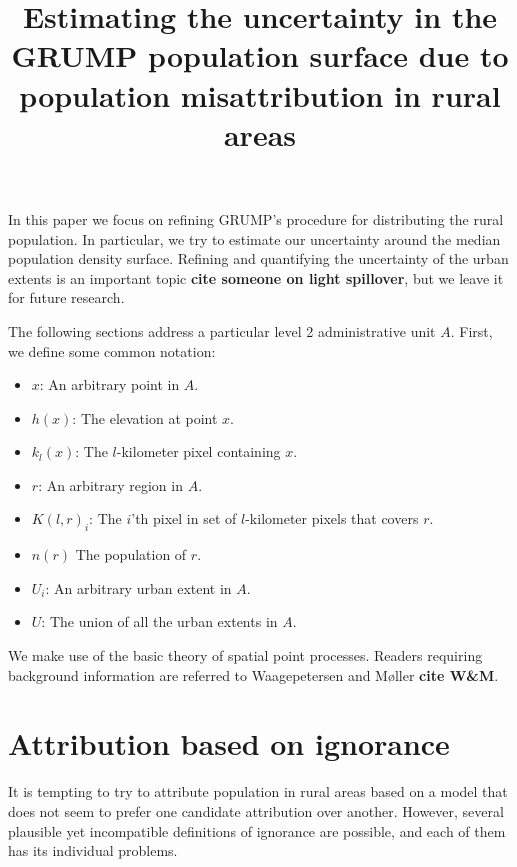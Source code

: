 \documentclass[a4paper]{article}
\begin{document}
\title{Estimating the uncertainty in the GRUMP population surface due to population misattribution in rural areas}
\maketitle

In this paper we focus on refining GRUMP's procedure for distributing the rural population. In particular, we try to estimate our uncertainty around the median population density surface. Refining and quantifying the uncertainty of the urban extents is an important topic \textbf{cite someone on light spillover}, but we leave it for future research.

The following sections address a particular level 2 administrative unit $A$. First, we define some common notation:
\begin{itemize}
	\item $x$: An arbitrary point in $A$.
	\item $h(x)$: The elevation at point $x$.
	\item $k_l(x)$: The $l$-kilometer pixel containing $x$.
	\item $r$: An arbitrary region in $A$.
	\item $K(l,r)_i$: The $i$'th pixel in set of $l$-kilometer pixels that covers $r$.	
	\item $n(r)$ The population of $r$.
	\item $U_i$: An arbitrary urban extent in $A$.
	\item $U$: The union of all the urban extents in $A$.
\end{itemize}
We make use of the basic theory of spatial point processes. Readers requiring background information are referred to Waagepetersen and M{\o}ller \textbf{cite W\&M}.

\section{Attribution based on ignorance}
It is tempting to try to attribute population in rural areas based on a model that does not seem to prefer one candidate attribution over another. However, several plausible yet incompatible definitions of ignorance are possible, and each of them has its individual problems.
\end{document}
